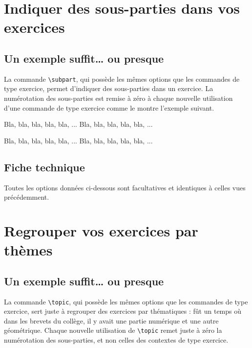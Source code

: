 \documentclass[12pt,a4paper]{article}
\makeatletter
\theoremstyle{definition}
\newcommand\resetallcnt{
		\setcounter{lyxam@counter@topic}{0}
		\setcounter{lyxam@counter@exercise}{0}
		\setcounter{lyxam@counter@problem}{0}
		\setcounter{lyxam@counter@bonus}{0}
		\setcounter{lyxam@counter@subpart}{0}
	}
\newcommand\IDmacro{\@ifstar{\@IDmacroStar}{\@IDmacroNoStar}}
\newcommand\@IDmacroNoStar[3]{%
        \texttt{%
        	\textbackslash#1%
        	\IfStrEq{#2}{0}{}{%
        		\,\,[#2 Option%
				\IfStrEq{#2}{1}{}{s}]%
			}%
    	    \IfStrEq{#3}{}{}{%
	    		\,\,(#3 Argument%
				\IfStrEq{#3}{1}{}{s})%
			}
	   	}
        \immediate\write\tempfile{macro@#1@#2@#3}%
    }
\newcommand\@IDmacroStar[2]{%
        \@IDmacroNoStar{#1}{0}{#2}%
    }
\makeatother
\begin{document}
\section{Indiquer des sous-parties dans vos exercices}

    \subsection{Un exemple suffit\dots{} ou presque}

La commande \verb+\subpart+, qui possède les mêmes options que les commandes de type exercice, permet d'indiquer des sous-parties dans un exercice. La numérotation des sous-parties est remise à zéro à chaque nouvelle utilisation d'une commande de type exercice comme le montre l'exemple suivant.

\resetallcnt{}

\begin{tcblisting}{}
\exercise
\subpart
Bla, bla, bla, bla, bla, ...
\subpart
Bla, bla, bla, bla, bla, ...

\exercise
\subpart
Bla, bla, bla, bla, bla, ...
\subpart
Bla, bla, bla, bla, bla, ...
\end{tcblisting}


    \subsection{Fiche technique}

Toutes les options données ci-dessous sont facultatives et identiques à celles vues précédemment.

\bigskip


\IDmacro{subpart}{6}{0}

\exosoptions{}



\section{Regrouper vos exercices par thèmes}

    \subsection{Un exemple suffit\dots{} ou presque}

La commande \verb+\topic+, qui possède les mêmes options que les commandes de type exercice, sert juste à regrouper des exercices par thématiques : fût un temps où dans les brevets du collège, il y avait une partie numérique et une autre géométrique.
Chaque nouvelle utilisation de \verb+\topic+ remet juste à zéro la numérotation des sous-parties, et non celles des contextes de type exercice.
\end{document}
